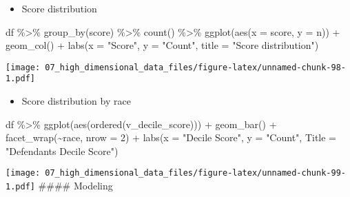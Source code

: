 \documentclass[
]{book}
\newenvironment{Shaded}{\begin{snugshade}}{\end{snugshade}}
\newcommand{\AttributeTok}[1]{\textcolor[rgb]{0.77,0.63,0.00}{#1}}
\newcommand{\DecValTok}[1]{\textcolor[rgb]{0.00,0.00,0.81}{#1}}
\newcommand{\FunctionTok}[1]{\textcolor[rgb]{0.00,0.00,0.00}{#1}}
\newcommand{\NormalTok}[1]{#1}
\newcommand{\SpecialCharTok}[1]{\textcolor[rgb]{0.00,0.00,0.00}{#1}}
\newcommand{\StringTok}[1]{\textcolor[rgb]{0.31,0.60,0.02}{#1}}
\providecommand{\tightlist}{%
  \setlength{\itemsep}{0pt}\setlength{\parskip}{0pt}}
\begin{document}
\begin{itemize}
\tightlist
\item
  Score distribution
\end{itemize}

\begin{Shaded}
\begin{Highlighting}[]
\NormalTok{df }\SpecialCharTok{\%\textgreater{}\%}
  \FunctionTok{group\_by}\NormalTok{(score) }\SpecialCharTok{\%\textgreater{}\%}
  \FunctionTok{count}\NormalTok{() }\SpecialCharTok{\%\textgreater{}\%}
  \FunctionTok{ggplot}\NormalTok{(}\FunctionTok{aes}\NormalTok{(}\AttributeTok{x =}\NormalTok{ score, }\AttributeTok{y =}\NormalTok{ n)) }\SpecialCharTok{+}
    \FunctionTok{geom\_col}\NormalTok{() }\SpecialCharTok{+}
    \FunctionTok{labs}\NormalTok{(}\AttributeTok{x =} \StringTok{"Score"}\NormalTok{,}
         \AttributeTok{y =} \StringTok{"Count"}\NormalTok{,}
         \AttributeTok{title =} \StringTok{"Score distribution"}\NormalTok{)}
\end{Highlighting}
\end{Shaded}

\texttt{[image: 07\_high\_dimensional\_data\_files/figure-latex/unnamed-chunk-98-1.pdf]}

\begin{itemize}
\tightlist
\item
  Score distribution by race
\end{itemize}

\begin{Shaded}
\begin{Highlighting}[]
\NormalTok{df }\SpecialCharTok{\%\textgreater{}\%}
  \FunctionTok{ggplot}\NormalTok{(}\FunctionTok{aes}\NormalTok{(}\FunctionTok{ordered}\NormalTok{(v\_decile\_score))) }\SpecialCharTok{+} 
          \FunctionTok{geom\_bar}\NormalTok{() }\SpecialCharTok{+}
          \FunctionTok{facet\_wrap}\NormalTok{(}\SpecialCharTok{\textasciitilde{}}\NormalTok{race, }\AttributeTok{nrow =} \DecValTok{2}\NormalTok{) }\SpecialCharTok{+}
          \FunctionTok{labs}\NormalTok{(}\AttributeTok{x =} \StringTok{"Decile Score"}\NormalTok{,}
               \AttributeTok{y =} \StringTok{"Count"}\NormalTok{,}
               \AttributeTok{Title =} \StringTok{"Defendant\textquotesingle{}s Decile Score"}\NormalTok{)}
\end{Highlighting}
\end{Shaded}

\texttt{[image: 07\_high\_dimensional\_data\_files/figure-latex/unnamed-chunk-99-1.pdf]}
\#\#\#\# Modeling
\end{document}
